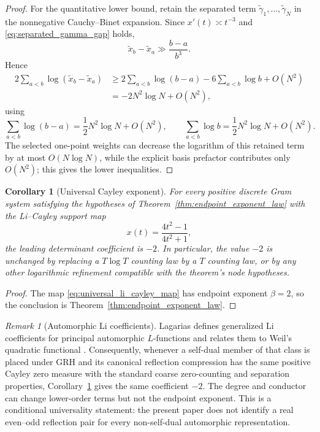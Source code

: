 \documentclass[preprint,12pt]{elsarticle}
\numberwithin{equation}{section}
\theoremstyle{plain}
\newtheorem{corollary}[theorem]{Corollary}
\theoremstyle{definition}
\theoremstyle{remark}
\newtheorem{remark}[theorem]{Remark}
\begin{document}
\begin{proof}
For the quantitative lower bound, retain the separated term $\widetilde\gamma_1,\ldots,\widetilde\gamma_N$ in the nonnegative Cauchy--Binet expansion. Since $x'(t)\asymp t^{-3}$ and \eqref{eq:separated_gamma_gap} holds,
\begin{equation}
\widetilde x_b-\widetilde x_a
\gg\frac{b-a}{b^3}.
\label{eq:regularized_x_gap}
\end{equation}
Hence
\begin{align}
2\sum_{a<b}\log(\widetilde x_b-\widetilde x_a)
&\ge
2\sum_{a<b}\log(b-a)-6\sum_{a<b}\log b+O(N^2)\\
&=-2N^2\log N+O(N^2),
\label{eq:regularized_vandermonde_lower}
\end{align}
using
\begin{equation}
\sum_{a<b}\log(b-a)=\frac12N^2\log N+O(N^2),
\qquad
\sum_{a<b}\log b=\frac12N^2\log N+O(N^2).
\label{eq:pair_log_sums}
\end{equation}
The selected one-point weights can decrease the logarithm of this retained term by at most \(O(N\log N)\), while the explicit basis prefactor contributes only \(O(N^2)\); this gives the lower inequalities.
\end{proof}

\begin{corollary}[Universal Cayley exponent]
\label{cor:universal_cayley_exponent}
For every positive discrete Gram system satisfying the hypotheses of Theorem~\ref{thm:endpoint_exponent_law} with the Li--Cayley support map
\begin{equation}
x(t)=\frac{4t^2-1}{4t^2+1},
\label{eq:universal_li_cayley_map}
\end{equation}
the leading determinant coefficient is $-2$. In particular, the value $-2$ is unchanged by replacing a $T\log T$ counting law by a $T$ counting law, or by any other logarithmic refinement compatible with the theorem's node hypotheses.
\end{corollary}

\begin{proof}
The map \eqref{eq:universal_li_cayley_map} has endpoint exponent $\beta=2$, so the conclusion is Theorem~\ref{thm:endpoint_exponent_law}.
\end{proof}

\begin{remark}[Automorphic Li coefficients]
\label{rem:automorphic_universality}
Lagarias defines generalized Li coefficients for principal automorphic $L$-functions and relates them to Weil's quadratic functional \cite{Lagarias2007}. Consequently, whenever a self-dual member of that class is placed under GRH and its canonical reflection compression has the same positive Cayley zero measure with the standard coarse zero-counting and separation properties, Corollary~\ref{cor:universal_cayley_exponent} gives the same coefficient $-2$. The degree and conductor can change lower-order terms but not the endpoint exponent. This is a conditional universality statement: the present paper does not identify a real even--odd reflection pair for every non-self-dual automorphic representation.
\end{remark}
\end{document}
